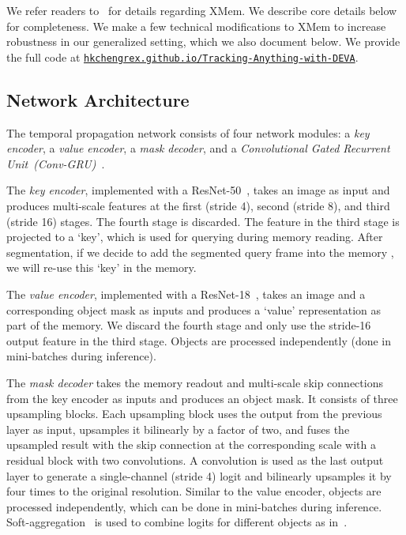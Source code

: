 We refer readers to~\cite{cheng2022xmem} for details regarding XMem. 
We describe core details below for completeness. 
We make a few technical modifications to XMem to increase robustness in our generalized setting, which we also document below. We  provide the full code at {\href{https://hkchengrex.github.io/Tracking-Anything-with-DEVA}{\nolinkurl{hkchengrex.github.io/Tracking-Anything-with-DEVA}}.}

\subsection{Network Architecture}
The temporal propagation network consists of four network modules: a \textit{key encoder}, a \textit{value encoder}, a \textit{mask decoder}, and a \textit{Convolutional Gated Recurrent Unit~(Conv-GRU)}~\cite{chung2014empirical}.

The \textit{key encoder}, implemented with a ResNet-50~\cite{he2016deepResNet}, takes an image as input and produces multi-scale features at the first (stride 4), second (stride 8), and third (stride 16) stages. The fourth stage is discarded.
The feature in the third stage is projected to a `key', which is used for querying during memory reading.
After segmentation, if we decide to add the segmented query frame into the memory , we will re-use this `key' in the memory.

The \textit{value encoder}, implemented with a ResNet-18~\cite{he2016deepResNet}, takes an image and a corresponding object mask as inputs and produces a `value' representation as part of the memory. 
We discard the fourth stage and only use the stride-16 output feature in the third stage.
Objects are processed independently (done in mini-batches during inference).

The \textit{mask decoder} takes the memory readout  and multi-scale skip connections from the key encoder as inputs and produces an object mask. 
It consists of three upsampling blocks. 
Each upsampling block uses the output from the previous layer as input, upsamples it bilinearly by a factor of two, and fuses the upsampled result with the skip connection at the corresponding scale with a residual block with two  convolutions.
A  convolution is used as the last output layer to generate a single-channel (stride 4) logit and bilinearly upsamples it by four times to the original resolution.
Similar to the value encoder, objects are processed independently, which can be done in mini-batches during inference.
Soft-aggregation~\cite{oh2019videoSTM} is used to combine logits for different objects as in~\cite{cheng2022xmem}.


